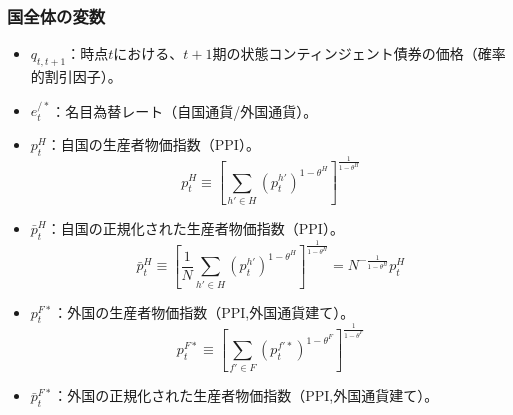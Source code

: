 \subsubsection*{国全体の変数}
\label{sec:chapter3_definitions_variables_endogenous_aggregate}
\begin{itemize}
    \item
    \label{itm:chapter3_definitions_variables_endogenous_aggregate_q}
        \(q_{t,t+1}\)：時点\(t\)における、\(t+1\)期の状態コンティンジェント債券の価格（確率的割引因子）。
    \item
    \label{itm:chapter3_definitions_variables_endogenous_aggregate_e_star}
        \(e_t^{/*}\)：名目為替レート（自国通貨/外国通貨）。
    \item
    \label{itm:chapter3_definitions_variables_endogenous_aggregate_p_H}
        \(p_t^H\)：自国の生産者物価指数（PPI）。
        \begin{equation}
        \label{form:chapter3_definitions_variables_endogenous_aggregate_p_H_def}
            p_t^H\equiv\left[\sum_{h'\in H}(p_t^{h'})^{1-\theta^H}\right]^{\frac{1}{1-\theta^H}}
        \end{equation}
    \item
    \label{itm:chapter3_definitions_variables_endogenous_aggregate_p_H_bar}
        \(\bar{p}_t^H\)：自国の正規化された生産者物価指数（PPI）。
        \begin{equation}
        \label{form:chapter3_definitions_variables_endogenous_aggregate_p_H_bar_def}
            \bar{p}_t^H\equiv\left[\frac{1}{N}\sum_{h'\in H}(p_t^{h'})^{1-\theta^H}\right]^{\frac{1}{1-\theta^H}}=N^{-\frac{1}{1-\theta^H}}p_t^H
        \end{equation}
    \item
    \label{itm:chapter3_definitions_variables_endogenous_aggregate_p_F_star}
        \(p_t^{F*}\)：外国の生産者物価指数（PPI,外国通貨建て）。
        \begin{equation}
        \label{form:chapter3_definitions_variables_endogenous_aggregate_p_F_star_def}
            p_t^{F*}\equiv\left[\sum_{f'\in F}(p_t^{f'*})^{1-\theta^F}\right]^{\frac{1}{1-\theta^F}}
        \end{equation}
    \item
    \label{itm:chapter3_definitions_variables_endogenous_aggregate_p_F_star_bar}
        \(\bar{p}_t^{F*}\)：外国の正規化された生産者物価指数（PPI,外国通貨建て）。
        \begin{equation}
        \label{form:chapter3_definitions_variables_endogenous_aggregate_p_F_star_bar_def}

\end{equation}
\end{itemize}
